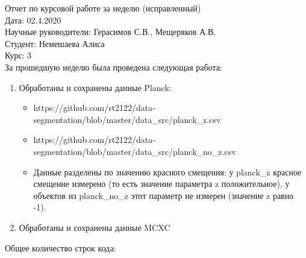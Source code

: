 \documentclass{article}
\begin{document}
Отчет по курсовой работе за неделю (исправленный)\\
Дата: 02.4.2020\\
Научные руководители: Герасимов С.В., Мещеряков А.В.\\
Студент: Немешаева Алиса\\
Курс: 3\\

За прошедшую неделю была проведена следующая работа:\\
\begin{enumerate}
    \item Обработаны и сохранены данные Planck: \\
        \begin{itemize}
            \item https://github.com/rt2122/data-segmentation/blob/master/data\_src/planck\_z.csv\\ 
            \item https://github.com/rt2122/data-segmentation/blob/master/data\_src/planck\_no\_z.csv\\
            \item Данные разделены по значению красного смещения: у planck\_z красное смещение измерено 
                (то есть значение параметра z положительное), у объектов из planck\_no\_z этот параметр не
                измерен (значение z равно -1).\\
        \end{itemize}
    \item Обработаны и сохранены данные MCXC\\
\end{enumerate}

Общее количество строк кода: \\
\end{document}
